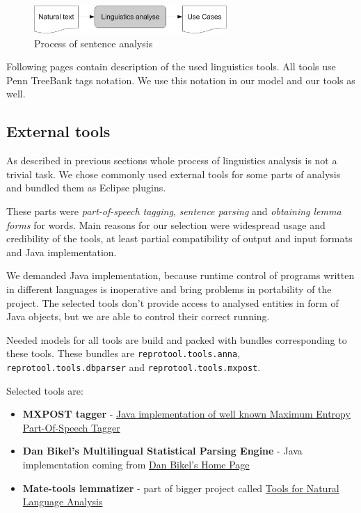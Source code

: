 \begin{figure}[ht]
  \centering
  \includegraphics[height=30pt]{images/LinguisticsAnalyseSmall}
  \caption{Process of sentence analysis}
  \label{fig:LinguisticsAnalyseSmall}
\end{figure}

Following pages contain description of the used linguistics tools. All tools use Penn TreeBank tags notation. We use this notation in our model and our tools as well.

\subsection{External tools}
\label{sec:externaltools}
As described in previous sections whole process of linguistics analysis is not a trivial task. We chose commonly used external tools for some parts of analysis and bundled them as Eclipse plugins.

These parts were \emph{part-of-speech tagging}, \emph{sentence parsing} and \emph{obtaining lemma forms} for words. Main reasons for our selection were widespread usage and credibility of the tools, at least partial compatibility of output and input formats and Java implementation. 

We demanded Java implementation, because runtime control of programs written in different languages is inoperative and bring problems in portability of the project. The selected tools don't provide access to analysed entities in form of Java objects, but we are able to control their correct running.

Needed models for all tools are build and packed with bundles corresponding to these tools. These bundles are \verb|reprotool.tools.anna|,  \verb|reprotool.tools.dbparser| and \verb|reprotool.tools.mxpost|.


Selected tools are:
 
\begin{itemize}
\item {\bf MXPOST tagger} - \href{http://www.inf.ed.ac.uk/resources/nlp/local_doc/MXPOST.html}{Java implementation of well known Maximum Entropy Part-Of-Speech Tagger}
\item {\bf Dan Bikel's Multilingual Statistical Parsing Engine } - Java implementation coming from \href{http://www.cis.upenn.edu/~dbikel/software.html#stat-parser}{Dan Bikel’s Home Page}
\item {\bf Mate-tools lemmatizer} - part of bigger project called \href{http://code.google.com/p/mate-tools/}{Tools for Natural Language Analysis}
\end{itemize}


